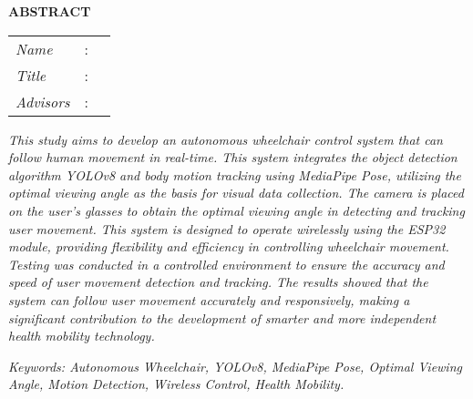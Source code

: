 \begin{center}
  \large\textbf{ABSTRACT}
\end{center}


\vspace{2ex}

\begingroup
\setlength{\tabcolsep}{0pt}

\noindent
\begin{tabularx}{\textwidth}{l >{\centering}m{3em} X}
  \emph{Name}     & : & \name{}         \\

  \emph{Title}    & : & \engtatitle{}   \\

  \emph{Advisors} & : & \advisor{}   \\
\end{tabularx}
\endgroup

\emph{This study aims to develop an autonomous wheelchair control system that can follow human movement in real-time. This system integrates the object detection algorithm \emph{YOLOv8} and body motion tracking using MediaPipe Pose, utilizing the optimal viewing angle as the basis for visual data collection. The camera is placed on the user's glasses to obtain the optimal viewing angle in detecting and tracking user movement. This system is designed to operate wirelessly using the ESP32 module, providing flexibility and efficiency in controlling wheelchair movement. Testing was conducted in a controlled environment to ensure the accuracy and speed of user movement detection and tracking. The results showed that the system can follow user movement accurately and responsively, making a significant contribution to the development of smarter and more independent health mobility technology.}

\emph{Keywords: Autonomous Wheelchair, YOLOv8, MediaPipe Pose, Optimal Viewing Angle, Motion Detection, Wireless Control, Health Mobility.}
